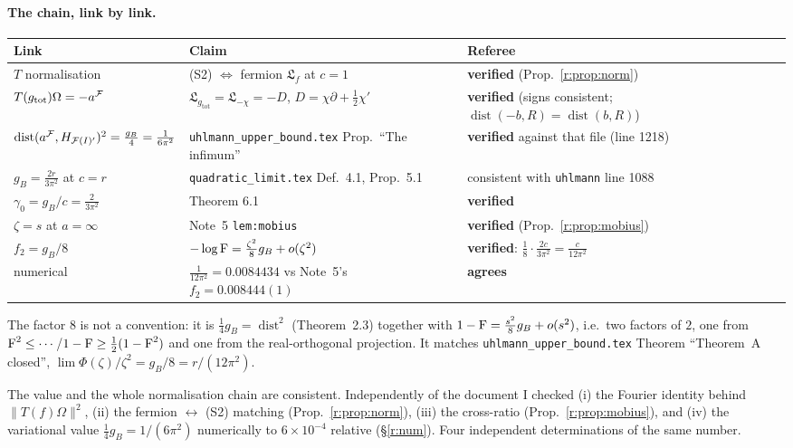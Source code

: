\documentclass[11pt]{article}
\newcommand{\norm}[1]{\lVert#1\rVert}
\newcommand{\dist}{\operatorname{dist}}
\newcommand{\gB}{g_B}
\newcommand{\Om}{\Omega}
\newcommand{\gtot}{g_{\mathrm{tot}}}
\begin{document}
\paragraph{The chain, link by link.}
\begin{center}\small
\begin{tabular}{@{}lll@{}}\toprule
Link & Claim & Referee\\\midrule
$T$ normalisation & (S2) $\Leftrightarrow$ fermion $\mathfrak L_f$ at $c=1$ & \textbf{verified}
 (Prop.~\ref{r:prop:norm}) \\
$T(\gtot)\Om=-a^{\cF}$ & $\mathfrak L_{\gtot}=\mathfrak L_{-\chi}=-D$, $D=\chi\partial+\frac12\chi'$
 & \textbf{verified} (signs consistent; $\dist(-b,R)=\dist(b,R)$)\\
$\dist(a^{\cF},H_{\cF(I)'})^2=\frac{\gB}4=\frac1{6\pi^2}$ & \texttt{uhlmann\_upper\_bound.tex}
 Prop.~``The infimum'' & \textbf{verified} against that file (line 1218)\\
$\gB=\frac{2r}{3\pi^2}$ at $c=r$ & \texttt{quadratic\_limit.tex} Def.~4.1, Prop.~5.1
 & consistent with \texttt{uhlmann} line 1088\\
$\gamma_0=\gB/c=\frac2{3\pi^2}$ & Theorem 6.1 & \textbf{verified}\\
$\zeta=s$ at $a=\infty$ & Note~5 \texttt{lem:mobius} & \textbf{verified} (Prop.~\ref{r:prop:mobius})\\
$f_2=\gB/8$ & $-\log\Fid=\frac{\zeta^2}8\gB+o(\zeta^2)$ & \textbf{verified}: $\frac18\cdot\frac{2c}{3\pi^2}
 =\frac c{12\pi^2}$\\
numerical & $\frac1{12\pi^2}=0.0084434$ vs Note~5's $f_2=0.008444(1)$ & \textbf{agrees}\\\bottomrule
\end{tabular}
\end{center}
The factor $8$ is not a convention: it is $\frac14\gB=\dist^2$ (Theorem~2.3) together with
$1-\Fid=\frac{s^2}8\gB+o(s^2)$, i.e.\ two factors of $2$, one from
$\operatorname{F}^2\le\cdots$/$1-\operatorname{F}\ge\frac12(1-\operatorname{F}^2)$ and one from the real-orthogonal projection.  It matches
\texttt{uhlmann\_upper\_bound.tex} Theorem ``Theorem~A closed'',
$\lim\Phi(\zeta)/\zeta^2=\gB/8=r/(12\pi^2)$.

\begin{verdictok}
The value and the whole normalisation chain are consistent.  Independently of the document I checked
(i) the Fourier identity behind $\norm{T(f)\Om}^2$, (ii) the fermion $\leftrightarrow$ (S2) matching
(Prop.~\ref{r:prop:norm}), (iii) the cross-ratio (Prop.~\ref{r:prop:mobius}), and (iv) the variational value
$\frac14\gB=1/(6\pi^2)$ numerically to $6\times10^{-4}$ relative (\S\ref{r:num}).  Four independent
determinations of the same number.
\end{verdictok}
\end{document}
